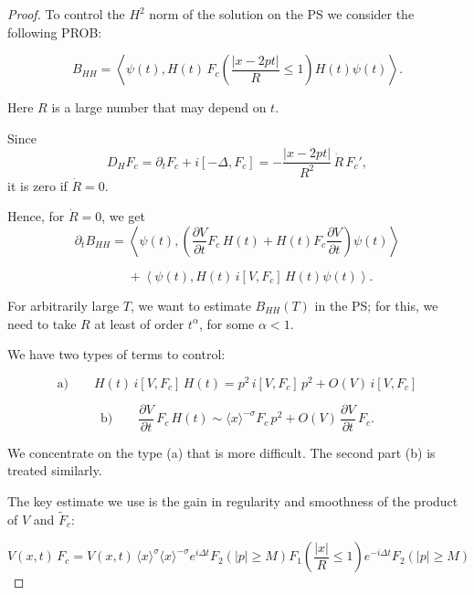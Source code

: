 \documentclass[11pt]{article}
\begin{document}
\begin{proof}
To control the $H^2$ norm of the solution on the PS
we consider the following PROB:

\begin{equation}
B_{HH}
=\left<\psi(t),H(t)\,F_c\!\left(\frac{|x-2pt|}{R}\leq 1\right)H(t)\psi(t)\right>.
\end{equation}

Here $R$ is a large number that may depend on $t$.

Since
\begin{equation}
D_H F_c
=
\partial_t F_c
+
i[-\Delta,F_c]
=
-\frac{|x-2pt|}{R^2}\,\dot R\,F_c',
\end{equation}
it is zero if $\dot R =0$.

Hence, for $\dot R=0$, we get
\begin{equation}
\partial_t B_{HH}
=
\left<
\psi(t),
\left(
\frac{\partial V}{\partial t}
F_c\,H(t)
+
H(t)F_c\frac{\partial V}{\partial t}
\right)
\psi(t)
\right>
\end{equation}

\[
\qquad
+
\left<
\psi(t),
H(t)\,i[V,F_c]\,H(t)\psi(t)
\right>.
\]

For arbitrarily large $T$, we want to estimate
$B_{HH}(T)$ in the PS; for this, we need to take
$R$ at least of order $t^\alpha$, for some $\alpha<1$.

We have two types of terms to control:

\begin{equation}
\text{a)}\qquad
H(t)\,i[V,F_c]\,H(t)
=
p^2\,i[V,F_c]\,p^2
+
O(V)\,i[V,F_c]
\end{equation}

\begin{equation}
\text{b)}\qquad
\frac{\partial V}{\partial t}\,
F_c\,H(t)
\sim
\langle x\rangle^{-\sigma}
F_c\,p^2
+
O(V)\,
\frac{\partial V}{\partial t}\,
F_c.
\end{equation}

We concentrate on the type (a) that is more
difficult. The second part (b) is treated similarly.

The key estimate we use is the gain in
regularity and smoothness of the product
of $V$ and $\widetilde F_c$:

\begin{equation}
V(x,t)\, F_c=V(x,t)\,
\langle x\rangle^\sigma\langle x\rangle^{-\sigma}
e^{i\Delta t}F_2(|p|\geq M)F_1\!\left(\frac{|x|}{R}\leq 1\right)e^{-i\Delta t}F_2(|p|\ge M)
\end{equation}


\end{proof}
\end{document}
